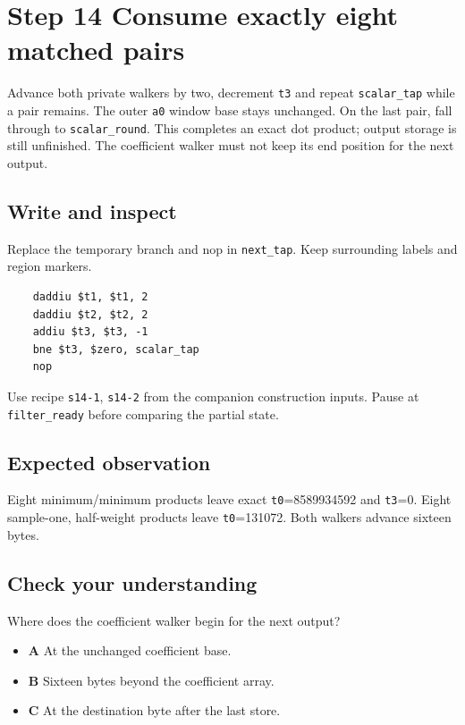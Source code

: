 \section{Step 14 Consume exactly eight matched pairs}\label{fir-s14}

Advance both private walkers by two, decrement \texttt{t3} and repeat \texttt{scalar\_tap} while a pair remains. The outer \texttt{a0} window base stays unchanged. On the last pair, fall through to \texttt{scalar\_round}. This completes an exact dot product; output storage is still unfinished. The coefficient walker must not keep its end position for the next output.

\subsection{Write and inspect}
Replace the temporary branch and nop in \texttt{next\_tap}. Keep surrounding labels and region markers.

\begin{verbatim}
    daddiu $t1, $t1, 2
    daddiu $t2, $t2, 2
    addiu $t3, $t3, -1
    bne $t3, $zero, scalar_tap
    nop
\end{verbatim}
Use recipe \texttt{s14-1}, \texttt{s14-2} from the companion construction inputs. Pause at \texttt{filter\_ready} before comparing the partial state.

\subsection{Expected observation}
Eight minimum/minimum products leave exact \texttt{t0}=8589934592 and \texttt{t3}=0. Eight sample-one, half-weight products leave \texttt{t0}=131072. Both walkers advance sixteen bytes.

\subsection{Check your understanding}
Where does the coefficient walker begin for the next output?

\begin{itemize}
  \item \textbf{A} At the unchanged coefficient base.
  \item \textbf{B} Sixteen bytes beyond the coefficient array.
  \item \textbf{C} At the destination byte after the last store.
\end{itemize}
